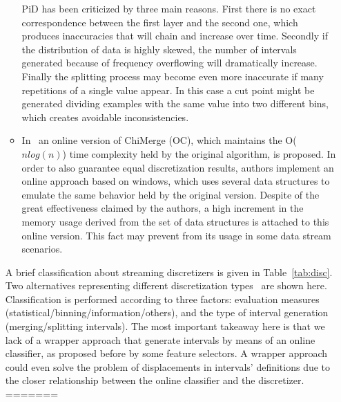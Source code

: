 \documentclass[preprint,12pt]{elsarticle}
\begin{document}
\begin{itemize}
\begin{itemize}
	PiD has been criticized by three main reasons. First there is no exact correspondence between the first layer and the second one, which produces inaccuracies that will chain and increase over time. Secondly if the distribution of data is highly skewed, the number of intervals generated because of frequency overflowing will dramatically increase. Finally the splitting process may become even more inaccurate if many repetitions of a single value appear. In this case a cut point might be generated dividing examples with the same value into two different bins, which creates avoidable inconsistencies.
	\item In~\cite{lehti12} an online version of ChiMerge (OC), which maintains the O($nlog(n)$) time complexity held by the original algorithm, is proposed. In order to also guarantee equal discretization results, authors implement an online approach based on windows, which uses several data structures to emulate the same behavior held by the original version. Despite of the great effectiveness claimed by the authors, a high increment in the memory usage derived from the set of data structures is attached to this online version. This fact may prevent from its usage in some data stream scenarios.
\end{itemize}

A brief classification about streaming discretizers is given in Table~\ref{tab:disc}. Two alternatives representing different discretization types~\cite{garcia14} are shown here. Classification is performed according to three factors: evaluation measures (statistical/binning/information/others), and the type of interval generation (merging/splitting intervals). The most important takeaway here is that we lack of a wrapper approach that generate intervals by means of an online classifier, as proposed before by some feature selectors. A wrapper approach could even solve the problem of displacements in intervals' definitions due to the closer relationship between the online classifier and the discretizer.
=======


\end{itemize}
\end{document}
